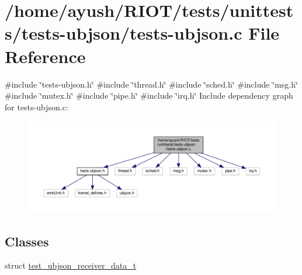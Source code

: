 \hypertarget{tests-ubjson_8c}{}\section{/home/ayush/\+R\+I\+O\+T/tests/unittests/tests-\/ubjson/tests-\/ubjson.c File Reference}
\label{tests-ubjson_8c}
{\ttfamily \#include \char`\"{}tests-\/ubjson.\+h\char`\"{}}\newline
{\ttfamily \#include \char`\"{}thread.\+h\char`\"{}}\newline
{\ttfamily \#include \char`\"{}sched.\+h\char`\"{}}\newline
{\ttfamily \#include \char`\"{}msg.\+h\char`\"{}}\newline
{\ttfamily \#include \char`\"{}mutex.\+h\char`\"{}}\newline
{\ttfamily \#include \char`\"{}pipe.\+h\char`\"{}}\newline
{\ttfamily \#include \char`\"{}irq.\+h\char`\"{}}\newline
Include dependency graph for tests-\/ubjson.c\+:
\nopagebreak
\begin{figure}[H]
\begin{center}
\leavevmode
\includegraphics[width=350pt]{tests-ubjson_8c__incl}
\end{center}
\end{figure}
\subsection*{Classes}
\begin{DoxyCompactItemize}
\item 
struct \hyperlink{structtest__ubjson__receiver__data__t}{test\+\_\+ubjson\+\_\+receiver\+\_\+data\+\_\+t}
\end{DoxyCompactItemize}

